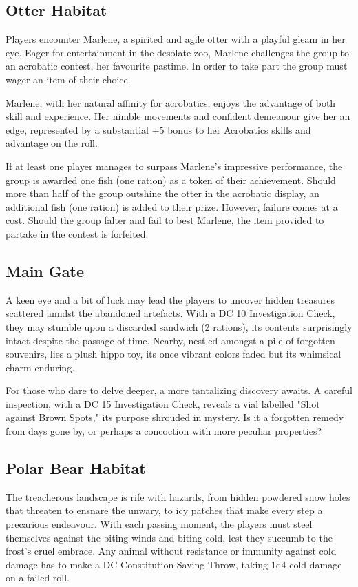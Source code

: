 \subsection*{ Otter Habitat}
Players encounter Marlene, a spirited and agile otter with a playful gleam in her eye. Eager for entertainment in the desolate zoo, Marlene challenges the group to an acrobatic contest, her favourite pastime. In order to take part the group must wager an item of their choice. 

Marlene, with her natural affinity for acrobatics, enjoys the advantage of both skill and experience. Her nimble movements and confident demeanour give her an edge, represented by a substantial +5 bonus to her Acrobatics skills and advantage on the roll.

If at least one player manages to surpass Marlene's impressive performance, the group is awarded one fish (one ration) as a token of their achievement. Should more than half of the group outshine the otter in the acrobatic display, an additional fish (one ration) is added to their prize. However, failure comes at a cost. Should the group falter and fail to best Marlene, the item provided to partake in the contest is forfeited.

\subsection*{ Main Gate}
A keen eye and a bit of luck may lead the players to uncover hidden treasures scattered amidst the abandoned artefacts. With a DC 10 Investigation Check, they may stumble upon a discarded sandwich (2 rations), its contents surprisingly intact despite the passage of time. Nearby, nestled amongst a pile of forgotten souvenirs, lies a plush hippo toy, its once vibrant colors faded but its whimsical charm enduring.

For those who dare to delve deeper, a more tantalizing discovery awaits. A careful inspection, with a DC 15 Investigation Check, reveals a vial labelled "Shot against Brown Spots," its purpose shrouded in mystery. Is it a forgotten remedy from days gone by, or perhaps a concoction with more peculiar properties?
\subsection*{ Polar Bear Habitat}
The treacherous landscape is rife with hazards, from hidden powdered snow holes that threaten to ensnare the unwary, to icy patches that make every step a precarious endeavour. With each passing moment, the players must steel themselves against the biting winds and biting cold, lest they succumb to the frost's cruel embrace. Any animal without resistance or immunity against cold damage has to make a DC Constitution Saving Throw, taking 1d4 cold damage on a failed roll.

